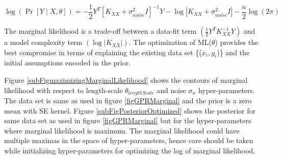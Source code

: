   \begin{equation}\label{eqExactNLML}
\log(\Pr [Y \mid X, \theta ]) = -\frac{1}{2}Y^{T}[K_{XX}+ \sigma_{noise}^{2}I]^{-1}Y - \log\left |  K_{XX}+ \sigma_{noise}^{2}I\right | - \frac{n}{2}\log(2\pi)
  \end{equation}
  
The marginal likelihood is a trade-off between a data-fit term \((\frac{1}{2}Y^{T}K_{XX}^{-1}Y)\) and a model complexity term \((\log\left |  K_{XX}\right |)\). The optimization of ML(\(\theta\)) provides the best compromise in terms of explaining the existing data set \{(\(x_{i}, y_{i}\))\} and the initial assumptions encoded in the prior. 

Figure \ref{subFigmaximizingMarginalLikelihood} shows the contours of marginal likelihood with respect to length-scale \(\theta_{lengthScale}\) and noise \(\sigma_{n}\) hyper-parameters. The data set is same as used in figure \ref{figGPRMarginal} and the prior is a zero mean with SE kernel. Figure \ref{subFigPosteriorOptimized} shows the posterior for same data set as used in figure \ref{figGPRMarginal} but for the hyper-parameters where marginal likelihood is maximum. The marginal likelihood could have multiple maximas in the space of hyper-parameters, hence care should be taken while initializing hyper-parameters for optimizing the log of marginal likelihood. 


